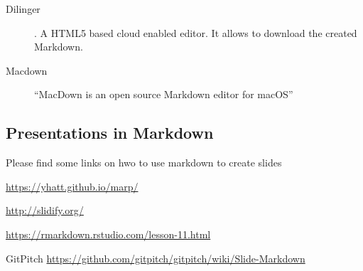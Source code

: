 \begin{description}
\item [Dilinger] . A HTML5 based cloud
  enabled editor. It allows to download the created Markdown.
\item[Macdown]  ``MacDown is an
  open source Markdown editor for macOS''
\end{description}

\subsection{Presentations in Markdown}

Please find some links on hwo to use markdown to create slides

\url{https://yhatt.github.io/marp/}

\url{http://slidify.org/}

\url{https://rmarkdown.rstudio.com/lesson-11.html}


GitPitch
\url{https://github.com/gitpitch/gitpitch/wiki/Slide-Markdown}